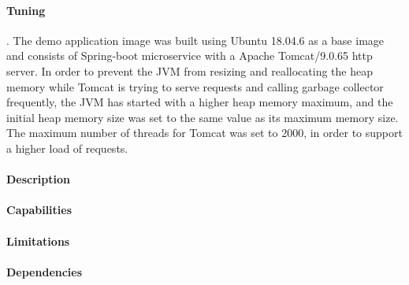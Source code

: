 \paragraph{Tuning}. The demo application image was built using Ubuntu 18.04.6 as a base image and consists of Spring-boot microservice with a Apache Tomcat/9.0.65 http server.
In order to prevent the JVM from resizing and reallocating the heap memory while Tomcat is trying to serve requests and
calling garbage collector frequently, the JVM has started with a higher heap memory maximum, and the initial heap memory
size was set to the same value as its maximum memory size.
The maximum number of threads for Tomcat was set to 2000, in order to support a higher load of requests.

\paragraph{Description}
\paragraph{Capabilities}
\paragraph{Limitations}
\paragraph{Dependencies}

